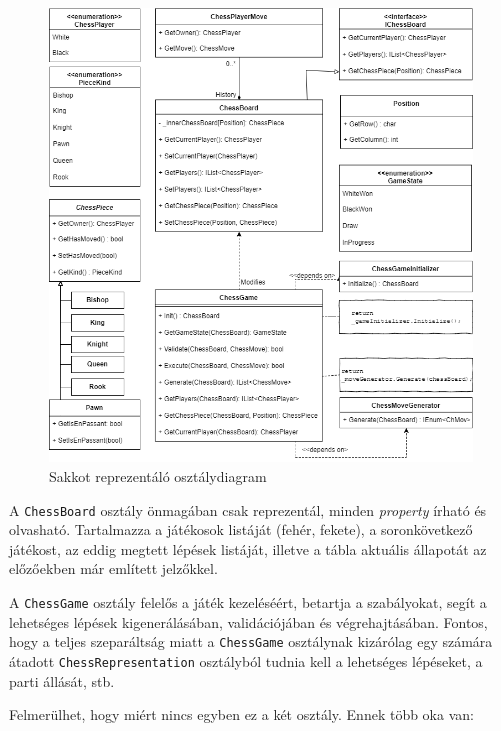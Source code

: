 \documentclass[twoside, a4paper, 12pt]{article}
\begin{document}
\begin{figure}[htbp]
	\centering
	\includegraphics[width=\textwidth]{img/chessClassDiagram.png}
	\caption{Sakkot reprezentáló osztálydiagram}
	\label{fig:chessClassDiagram}
\end{figure}

A \texttt{ChessBoard} osztály önmagában csak reprezentál, minden \textit{property} írható és olvasható. Tartalmazza a játékosok listáját (fehér, fekete), a soronkövetkező játékost, az eddig megtett lépések listáját, illetve a tábla aktuális állapotát az előzőekben már említett jelzőkkel.

A \texttt{ChessGame} osztály felelős a játék kezeléséért, betartja a szabályokat, segít a lehetséges lépések kigenerálásában, validációjában és végrehajtásában. Fontos, hogy a teljes szeparáltság miatt a \texttt{ChessGame} osztálynak kizárólag egy számára átadott \texttt{ChessRepresentation} osztályból tudnia kell a lehetséges lépéseket, a parti állását, stb.

Felmerülhet, hogy miért nincs egyben ez a két osztály. Ennek több oka van:
\end{document}
